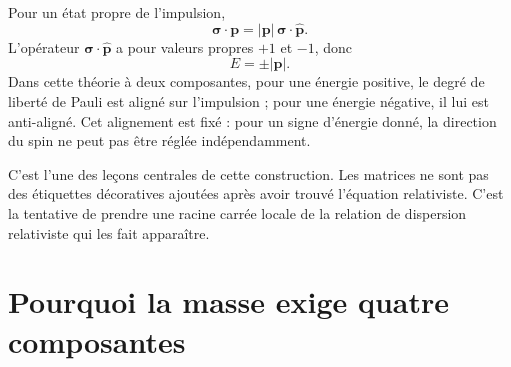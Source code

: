Pour un état propre de l’impulsion,
\begin{equation}
\boldsymbol{\sigma}\cdot\mathbf p
=
|\mathbf p|\,\boldsymbol{\sigma}\cdot\widehat{\mathbf p}.
\end{equation}
L’opérateur \(\boldsymbol{\sigma}\cdot\widehat{\mathbf p}\) a pour valeurs propres \(+1\) et \(-1\), donc
\begin{equation}
E=\pm|\mathbf p|.
\end{equation}
Dans cette théorie à deux composantes, pour une énergie positive, le degré de liberté de Pauli est aligné sur l’impulsion ; pour une énergie négative, il lui est anti-aligné. Cet alignement est fixé : pour un signe d’énergie donné, la direction du spin ne peut pas être réglée indépendamment.

\begin{classroomqa}
\end{classroomqa}

C’est l’une des leçons centrales de cette construction. Les matrices ne sont pas des étiquettes décoratives ajoutées après avoir trouvé l’équation relativiste. C’est la tentative de prendre une racine carrée locale de la relation de dispersion relativiste qui les fait apparaître.

\section{Pourquoi la masse exige quatre composantes}

